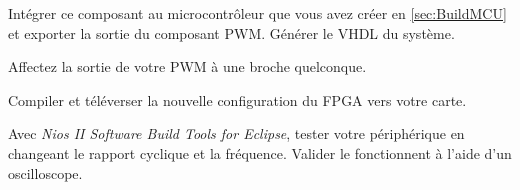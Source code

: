 \medskip

Intégrer ce composant au microcontrôleur que vous avez créer en \ref{sec:BuildMCU} et exporter la sortie du composant PWM. Générer le VHDL du système.

\medskip

Affectez la sortie de votre PWM à une broche quelconque.

\medskip

Compiler et téléverser la nouvelle configuration du FPGA vers votre carte.

\medskip

Avec \textit{Nios II Software Build Tools for Eclipse}, tester votre périphérique en changeant le rapport cyclique et la fréquence. Valider le fonctionnent à l'aide d'un oscilloscope.